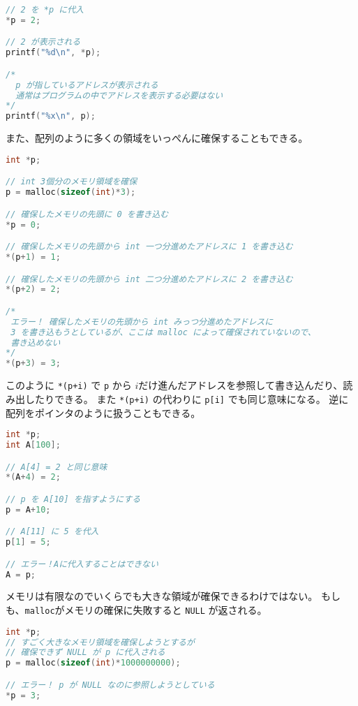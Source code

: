 \documentclass[a4paper,twoside,onecolumn,openany,article]{memoir}
\theoremstyle{remark}
\begin{document}
\begin{lstlisting}[basicstyle=\ttfamily\small,showstringspaces=false,language=C,frame=single]
// 2 を *p に代入
*p = 2;

// 2 が表示される
printf("%d\n", *p);

/*
  p が指しているアドレスが表示される
  通常はプログラムの中でアドレスを表示する必要はない
*/
printf("%x\n", p);
\end{lstlisting}
また、配列のように多くの領域をいっぺんに確保することもできる。
\begin{lstlisting}[basicstyle=\ttfamily\small,showstringspaces=false,language=C,frame=single]
int *p;

// int 3個分のメモリ領域を確保
p = malloc(sizeof(int)*3);

// 確保したメモリの先頭に 0 を書き込む
*p = 0;

// 確保したメモリの先頭から int 一つ分進めたアドレスに 1 を書き込む
*(p+1) = 1;

// 確保したメモリの先頭から int 二つ分進めたアドレスに 2 を書き込む
*(p+2) = 2;

/*
 エラー！ 確保したメモリの先頭から int みっつ分進めたアドレスに
 3 を書き込もうとしているが、ここは malloc によって確保されていないので、
 書き込めない
*/
*(p+3) = 3;
\end{lstlisting}
このように \texttt{*(p+i)} で \texttt{p} から $i$だけ進んだアドレスを参照して書き込んだり、読み出したりできる。
また \texttt{*(p+i)} の代わりに \texttt{p[i]} でも同じ意味になる。
逆に配列をポインタのように扱うこともできる。
\begin{lstlisting}[basicstyle=\ttfamily\small,showstringspaces=false,language=C,frame=single]
int *p;
int A[100];

// A[4] = 2 と同じ意味
*(A+4) = 2;

// p を A[10] を指すようにする
p = A+10;

// A[11] に 5 を代入
p[1] = 5;

// エラー！Aに代入することはできない
A = p;
\end{lstlisting}
メモリは有限なのでいくらでも大きな領域が確保できるわけではない。
もしも、\texttt{malloc}がメモリの確保に失敗すると \texttt{NULL} が返される。
\begin{lstlisting}[basicstyle=\ttfamily\small,showstringspaces=false,language=C,frame=single]
int *p;
// すごく大きなメモリ領域を確保しようとするが
// 確保できず NULL が p に代入される
p = malloc(sizeof(int)*1000000000);

// エラー！ p が NULL なのに参照しようとしている
*p = 3;
\end{lstlisting}
\end{document}
